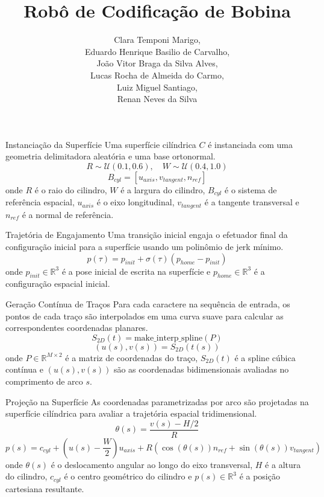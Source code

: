\documentclass[aspectratio=169]{beamer}
\title{Robô de Codificação de Bobina}
\author{Clara Temponi Marigo, \\
        Eduardo Henrique Basilio de Carvalho, \\
        João Vitor Braga da Silva Alves, \\
        Lucas Rocha de Almeida do Carmo, \\
        Luiz Miguel Santiago, \\
        Renan Neves da Silva
        }
\date{}
\begin{document}
\frame{\titlepage}

\begin{frame}{Instanciação da Superfície}
Uma superfície cilíndrica $C$ é instanciada com uma geometria delimitadora aleatória e uma base ortonormal.
\begin{equation}
    R \sim \mathcal{U}(0.1, 0.6), \quad W \sim \mathcal{U}(0.4, 1.0)
\end{equation}
\begin{equation}
    B_{cyl} = [u_{axis}, v_{tangent}, n_{ref}]
\end{equation}
onde $R$ é o raio do cilindro, $W$ é a largura do cilindro, $B_{cyl}$ é o sistema de referência espacial, $u_{axis}$ é o eixo longitudinal, $v_{tangent}$ é a tangente transversal e $n_{ref}$ é a normal de referência.
\end{frame}

\begin{frame}{Trajetória de Engajamento}
Uma transição inicial engaja o efetuador final da configuração inicial para a superfície usando um polinômio de jerk mínimo.
\begin{equation}
    p(\tau) = p_{init} + \sigma(\tau)(p_{home} - p_{init})
\end{equation}
onde $p_{init} \in \mathbb{R}^3$ é a pose inicial de escrita na superfície e $p_{home} \in \mathbb{R}^3$ é a configuração espacial inicial.
\end{frame}

\begin{frame}{Geração Contínua de Traços}
Para cada caractere na sequência de entrada, os pontos de cada traço são interpolados em uma curva suave para calcular as correspondentes coordenadas planares.
\begin{equation}
    S_{2D}(t) = \text{make\_interp\_spline}(P)
\end{equation}
\begin{equation}
    (u(s), v(s)) = S_{2D}(t(s))
\end{equation}
onde $P \in \mathbb{R}^{M \times 2}$ é a matriz de coordenadas do traço, $S_{2D}(t)$ é a spline cúbica contínua e $(u(s), v(s))$ são as coordenadas bidimensionais avaliadas no comprimento de arco $s$.
\end{frame}

\begin{frame}{Projeção na Superfície}
As coordenadas parametrizadas por arco são projetadas na superfície cilíndrica para avaliar a trajetória espacial tridimensional.
\begin{equation}
    \theta(s) = \frac{v(s) - H/2}{R}
\end{equation}
\begin{equation}
    p(s) = c_{cyl} + \left(u(s) - \frac{W}{2}\right)u_{axis} + R \left( \cos(\theta(s))n_{ref} + \sin(\theta(s))v_{tangent} \right)
\end{equation}
onde $\theta(s)$ é o deslocamento angular ao longo do eixo transversal, $H$ é a altura do cilindro, $c_{cyl}$ é o centro geométrico do cilindro e $p(s) \in \mathbb{R}^3$ é a posição cartesiana resultante.
\end{frame}
\end{document}
